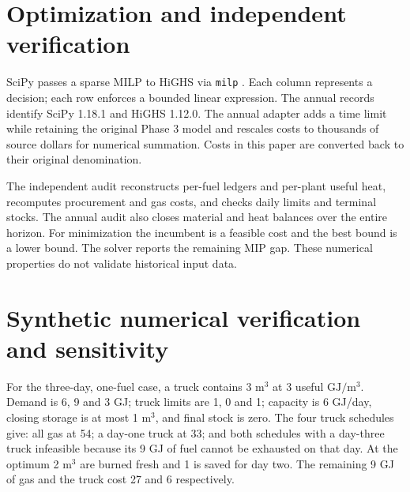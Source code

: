 \documentclass[11pt,a4paper]{article}
\begin{document}
\section{Optimization and independent verification}
SciPy \cite{scipy2020} passes a sparse MILP to HiGHS via \texttt{milp}
\cite{scipymilp,huangfu2018}. Each column represents a decision; each row
enforces a bounded linear expression. The annual records identify SciPy
1.18.1 and HiGHS 1.12.0. The annual adapter adds a time limit while
retaining the original Phase 3 model and rescales costs to thousands of
source dollars for numerical summation. Costs in this paper are converted
back to their original denomination.

The independent audit reconstructs per-fuel ledgers and per-plant useful heat,
recomputes procurement and gas costs, and checks daily limits and terminal
stocks. The annual audit also closes material and heat balances over the entire
horizon. For minimization the incumbent is a feasible cost and the best bound
is a lower bound. The solver reports the remaining MIP gap. These numerical
properties do not validate historical input data.

\section{Synthetic numerical verification and sensitivity}
For the three-day, one-fuel case, a truck contains 3 \(\mathrm{m^3}\) at
3 useful \(\mathrm{GJ/m^3}\). Demand is 6, 9 and 3 GJ; truck limits are
1, 0 and 1; capacity is 6 GJ/day, closing storage is at most
1 \(\mathrm{m^3}\), and final stock is zero. The four truck schedules give:
all gas at 54; a day-one truck at 33; and both schedules with a day-three
truck infeasible because its 9 GJ of fuel cannot be exhausted on that day.
At the optimum 2 \(\mathrm{m^3}\) are burned fresh and 1 is saved for day two.
The remaining 9 GJ of gas and the truck cost 27 and 6 respectively.
\end{document}
